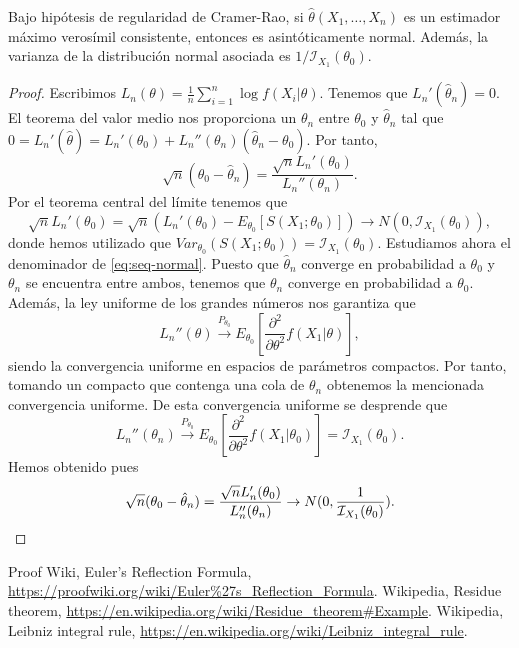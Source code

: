 \documentclass{article}
\begin{document}
    \begin{thm}
        Bajo hipótesis de regularidad de Cramer-Rao, si $\hat{\theta}(X_1, \ldots, X_n)$ es un estimador máximo verosímil consistente, entonces es asintóticamente normal. Además, la varianza de la distribución normal asociada es $1/\mathcal{I}_{X_1}(\theta_0)$.
    \end{thm}
    \begin{proof}
        Escribimos $L_n(\theta) = \frac{1}{n}\sum_{i = 1}^n \log f(X_i|\theta)$. Tenemos que $L_n'(\hat\theta_n) = 0$. El teorema del valor medio nos proporciona un $\theta_n$ entre $\theta_0$ y $\hat\theta_n$ tal que $0 = L_n'(\hat\theta) = L_n'(\theta_0) + L_n''(\theta_n)(\hat\theta_n - \theta_0)$. Por tanto,
        \begin{equation} \label{eq:seq-normal}
            \sqrt{n}(\theta_0 - \hat\theta_n) = \frac{\sqrt{n}L_n'(\theta_0)}{L_n''(\theta_n)}.
        \end{equation}
        Por el teorema central del límite tenemos que
        \[\sqrt{n}L_n'(\theta_0) = \sqrt{n}(L_n'(\theta_0) - E_{\theta_0}[S(X_1; \theta_0)]) \to N(0, \mathcal{I}_{X_1}(\theta_0)),\]
        donde hemos utilizado que $Var_{\theta_0}(S(X_1; \theta_0)) = \mathcal{I}_{X_1}(\theta_0)$.
        Estudiamos ahora el denominador de \eqref{eq:seq-normal}. Puesto que $\hat\theta_n$ converge en probabilidad a $\theta_0$ y $\theta_n$ se encuentra entre ambos, tenemos que $\theta_n$ converge en probabilidad a $\theta_0$. Además, la ley uniforme de los grandes números nos garantiza que
        \[L_n''(\theta) \xrightarrow{P_{\theta_0}} E_{\theta_0}\left[\frac{\partial^2}{\partial \theta^2}f(X_1|\theta)\right],\]
        siendo la convergencia uniforme en espacios de parámetros compactos. Por tanto, tomando un compacto que contenga una cola de $\theta_n$ obtenemos la mencionada convergencia uniforme. De esta convergencia uniforme se desprende que
        \[L_n''(\theta_n) \xrightarrow{P_{\theta_0}} E_{\theta_0}\left[\frac{\partial^2}{\partial \theta^2}f(X_1|\theta_0)\right] = \mathcal{I}_{X_1}(\theta_0).\]
        Hemos obtenido pues
        \[\sqrt{n}(\theta_0 - \hat\theta_n) = \frac{\sqrt{n}L_n'(\theta_0)}{L_n''(\theta_n)} \rightarrow N(0, \frac{1}{\mathcal{I}_{X_1}(\theta_0)}). \qedhere\]
    \end{proof}

\begin{thebibliography}{99}
 Proof Wiki, Euler's Reflection Formula, \url{https://proofwiki.org/wiki/Euler%27s_Reflection_Formula}.
 Wikipedia, Residue theorem, \url{https://en.wikipedia.org/wiki/Residue_theorem#Example}.
 Wikipedia, Leibniz integral rule, \url{https://en.wikipedia.org/wiki/Leibniz_integral_rule}.
\end{thebibliography}
\end{document}

